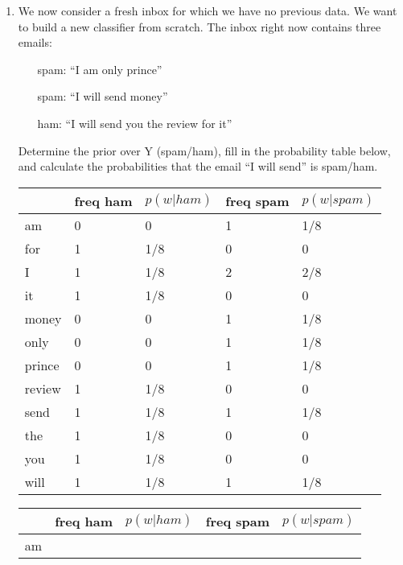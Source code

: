 \documentclass[11pt]{article}
\newif\ifsol
\begin{document}
\begin{enumerate}
\begin{enumerate}
\item We now consider a fresh inbox for which we have no previous data. We want to build a new classifier from scratch. The inbox right now contains three emails:
\begin{enumerate}
\item [spam:] ``I am only prince''
\item [spam:] ``I will send money''
\item [ham:] ``I will send you the review for it''
\end{enumerate}
Determine the prior over Y (spam/ham), fill in the probability table below, and calculate the probabilities that the email ``I will send'' is spam/ham.\\
\ifsol
\begin{table}[h!]
\centering
\begin{tabular}{@{}lllll@{}}
\toprule
       & freq ham & $p(w|ham)$ & freq spam & $p(w|spam)$ \\ \midrule
am     & 0        & 0          & 1         & 1/8         \\
for    & 1        & 1/8        & 0         & 0           \\
I      & 1        & 1/8        & 2         & 2/8         \\
it     & 1        & 1/8        & 0         & 0           \\
money  & 0        & 0          & 1         & 1/8         \\
only   & 0        & 0          & 1         & 1/8         \\
prince & 0        & 0          & 1         & 1/8         \\
review & 1        & 1/8        & 0         & 0           \\
send   & 1        & 1/8        & 1         & 1/8         \\
the    & 1        & 1/8        & 0         & 0           \\
you    & 1        & 1/8        & 0         & 0           \\
will   & 1        & 1/8        & 1         & 1/8         \\ \bottomrule
\end{tabular}
\end{table}
\else
\begin{table}[h!]
\centering
\begin{tabular}{@{}lllll@{}}
\toprule
       & freq ham & $p(w|ham)$ & freq spam & $p(w|spam)$ \\ \midrule
am     &         &           &          &          \\

\end{tabular}
\end{table}
\end{enumerate}
\end{enumerate}
\end{document}
